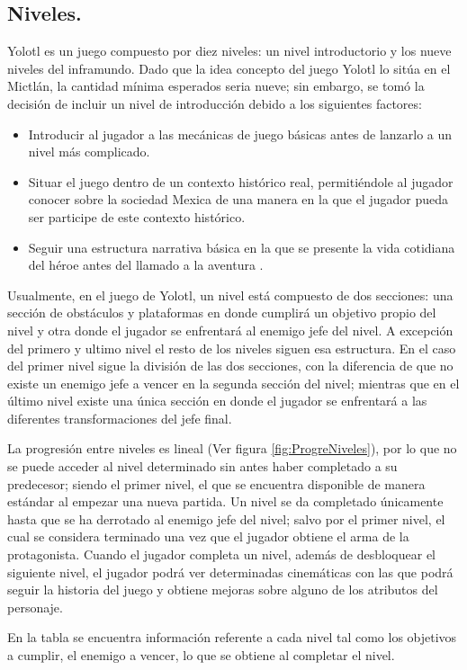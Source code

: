 \subsection{Niveles.}
Yolotl es un juego compuesto por diez niveles: un nivel introductorio y los nueve niveles del inframundo.  Dado que la idea concepto del juego Yolotl lo sitúa en el Mictlán, la cantidad mínima esperados seria nueve; sin embargo, se tomó la decisión de incluir un nivel de introducción debido a los siguientes factores: 

\begin{itemize}
	\item Introducir al jugador a las mecánicas de juego básicas antes de lanzarlo a un nivel más complicado.
	\item Situar el juego dentro de un contexto histórico real, permitiéndole al jugador conocer sobre la sociedad Mexica de una manera en la que el jugador pueda ser participe de este contexto histórico.
	\item Seguir una estructura narrativa básica en la que se presente la vida cotidiana del héroe antes del llamado a la aventura \cite{Ref:Heroe}.
\end{itemize}

Usualmente, en el juego de Yolotl, un nivel está compuesto de dos secciones: una sección de obstáculos y plataformas en donde cumplirá un objetivo propio del nivel y otra donde el jugador se enfrentará al enemigo jefe del nivel. A excepción del primero y ultimo nivel el resto de los niveles siguen esa estructura. En el caso del primer nivel sigue la división de las dos secciones, con la diferencia de que no existe un enemigo jefe a vencer en la segunda sección del nivel; mientras que en el último nivel existe una única sección en donde el jugador se enfrentará a las diferentes transformaciones del jefe final.
\\
\par
La progresión entre niveles es lineal (Ver figura \ref{fig:ProgreNiveles}), por lo que no se puede acceder al nivel determinado sin antes haber completado a su predecesor; siendo el primer nivel, el que se encuentra disponible de manera estándar al empezar una nueva partida. Un nivel se da completado únicamente hasta que se ha derrotado al enemigo jefe del nivel; salvo por el primer nivel, el cual se considera terminado una vez que el jugador obtiene el arma de la protagonista. Cuando el jugador completa un nivel, además de desbloquear el siguiente nivel, el jugador podrá ver determinadas cinemáticas con las que podrá seguir la historia del juego y obtiene mejoras sobre alguno de los atributos del personaje.
\\
\par
En la tabla se encuentra información referente a cada nivel tal como los objetivos a cumplir, el enemigo a vencer, lo que se obtiene al completar el nivel.

